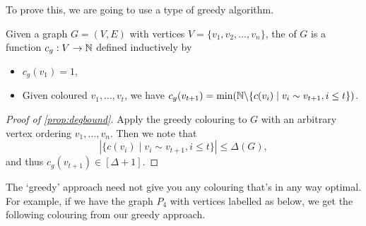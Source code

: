 \documentclass[a4paper]{scrreprt}
\begin{document}
To prove this, we are going to use a type of greedy algorithm.

\begin{definition}
	Given a graph $G = (V, E)$ with vertices $V = \{v_1, v_2, \dots, v_n\}$, the  of $G$ is a function $c_g: V\rightarrow \mathbb{N}$ defined inductively by
	\begin{itemize}
		\item $c_g(v_1) = 1$,
		\item Given coloured $v_1, \dots, v_t$, we have $c_g(v_{t + 1}) = \min(\mathbb{N}\backslash \{c(v_i) \mid v_i \sim v_{t + 1}, i \leq t\})$.
	\end{itemize}
\end{definition}

\begin{proof}[Proof of \autoref{prop:degbound}]
	Apply the greedy colouring to $G$ with an arbitrary vertex ordering $v_1, \dots, v_n$. Then we note that
	$$
	|\{c(v_i) \mid v_i \sim v_{t + 1}, i \leq t\}| \leq \Delta(G),
	$$
	and thus $c_g(v_{t + 1}) \in [\Delta + 1]$.
\end{proof}

The `greedy' approach need not give you any colouring that's in any way optimal. For example, if we have the graph $P_4$ with vertices labelled as below, we get the following colouring from our greedy approach.
\end{document}
